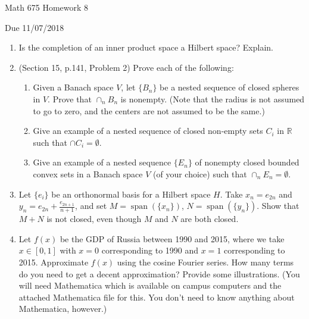 \documentclass[12pt,letterpaper,reqno]{amsart}
\newcommand{\R}{\mathbb R}
\renewcommand{\span}{\operatorname{span}}
\begin{document}
\thispagestyle{empty}
\centerline{\Large Math 675 Homework 8}
\centerline{Due 11/07/2018}
\vspace{.25in}

\begin{enumerate}[1.]
\item Is the completion of an inner product space a Hilbert space? Explain.
\item (Section 15, p.141, Problem 2) Prove each of the following:
\begin{enumerate}
\item Given a Banach space $V$, let $\{B_n\}$ be a nested sequence of closed spheres in $V$. Prove that $\cap_n B_n$ is nonempty. (Note that the radius is not assumed to go to zero, and the centers are not assumed to be the same.)
\item Give an example of a nested sequence of closed non-empty sets $C_i$ in $\R$ such that $\cap C_i=\emptyset$.
\item Give an example of a nested sequence $\{E_n\}$ of nonempty closed bounded convex sets in a Banach space $V$ (of your choice) such that $\cap_n E_n=\emptyset$.
\end{enumerate}
\item Let $\{e_i\}$ be an orthonormal basis for a Hilbert space $H$. Take $x_n=e_{2n}$ and $y_n=e_{2n}+\frac{e_{2n+1}}{n+1}$, and set $M=\span(\{x_n\})$, $N=\span(\{y_n\})$. Show that $M+N$ is not closed, even though $M$ and $N$ are both closed.
\item Let $f(x)$ be the GDP of Russia between 1990 and 2015, where we take $x\in [0,1]$ with $x=0$ corresponding to 1990 and $x=1$ corresponding to 2015. Approximate $f(x)$ using the cosine Fourier series. How many terms do you need to get a decent approximation? Provide some illustrations. (You will need Mathematica which is available on campus computers and the attached Mathematica file for this. You don't need to know anything about Mathematica, however.)
\end{enumerate}
\end{document}
